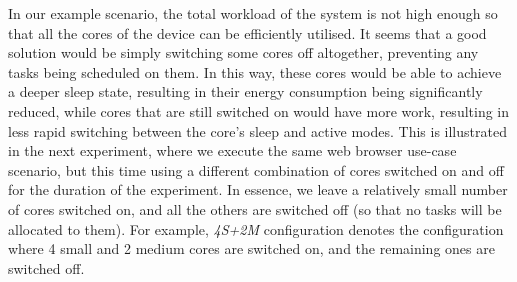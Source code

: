 \documentclass[conference]{IEEEtran}
\begin{document}

In our example scenario, the total workload of the system is not high enough so that all the cores of the device can be efficiently utilised. It seems that a good solution would be simply switching some cores off altogether, preventing any tasks being scheduled on them. In this way, these cores would be able to achieve a deeper sleep state, resulting in their energy consumption being significantly reduced, while cores that are still switched on would have more work, resulting in less rapid switching between the core's sleep and active modes.
This is illustrated in the next experiment, where we execute the same web browser use-case scenario, but this time using a different combination of cores switched on and off for the duration of the experiment. In essence, we leave a relatively small number of cores switched on, and all the others are switched off (so that no tasks will be allocated to them). For example, \emph{4S+2M} configuration denotes the configuration where 4 small and 2 medium cores are switched on, and the remaining ones are switched off.
\end{document}
